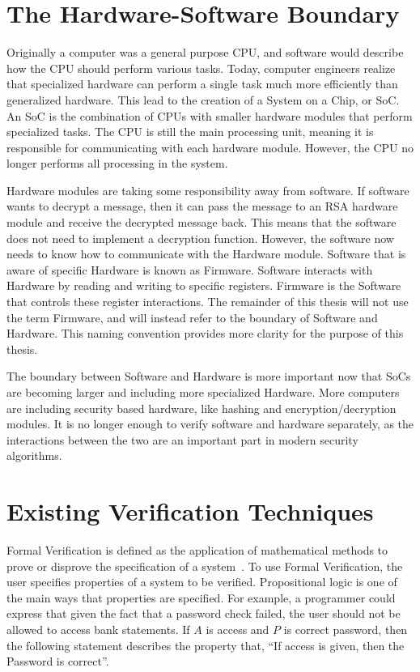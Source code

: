 \section{The Hardware-Software Boundary}

Originally a computer was a general purpose CPU, and software would
describe how the CPU should perform various tasks.
Today, computer engineers realize that specialized hardware can perform a single
task much more efficiently than generalized hardware.
This lead to the creation of a System on a Chip, or SoC. An SoC is the
combination of CPUs with smaller hardware modules that perform specialized
tasks.
The CPU is still the main processing unit, meaning it is responsible for
communicating with each hardware module.
However, the CPU no longer performs all processing in the system.

Hardware modules are taking some responsibility away from software.
If software wants to decrypt a message, then it can pass the message to an RSA
hardware module and receive the decrypted message back.
This means that the software does not need to implement a decryption function.
However, the software now needs to know how to communicate with the Hardware
module. 
Software that is aware of specific Hardware is known as Firmware.
Software interacts with Hardware by reading and writing to specific registers.
Firmware is the Software that controls these register interactions.
The remainder of this thesis will not use the term Firmware, and will instead refer to the boundary of Software and Hardware.
This naming convention provides more clarity for the purpose of this thesis.

The boundary between Software and Hardware is more important now that SoCs are becoming larger and including more
specialized Hardware. 
More computers are including security based hardware, like hashing and encryption/decryption modules.
It is no longer enough to verify software and hardware separately, as the
interactions between the two are an important part in modern security
algorithms.

\section{Existing Verification Techniques}

Formal Verification is defined as the application of mathematical methods to
prove or disprove the specification of a system~\cite{greenstreet}.
To use Formal Verification, the user specifies properties of a system to be verified.
Propositional logic is one of the main ways that properties are specified.
For example, a programmer could express that given the fact that a password
check failed, the user should not be allowed to access bank statements.
If $A$ is access and $P$ is correct password, then the following statement
describes the property that, ``If access is given, then the Password is correct''.

